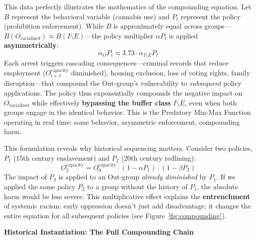 \documentclass[12pt,openany]{book}
\begin{document}
This data perfectly illustrates the mathematics of the compounding equation. Let $B$ represent the behavioral variable (cannabis use) and $P_t$ represent the policy (prohibition enforcement). While $B$ is approximately equal across groups---$B(O_{\text{racialized}}) \approx B(I \setminus E)$---the policy multiplier $\alpha P_t$ is applied \textbf{asymmetrically}:
\[
\alpha_{O} P_t \approx 3.73 \cdot \alpha_{I \setminus E} P_t
\]
Each arrest triggers cascading consequences---criminal records that reduce employment ($O_{t+1}^{\text{capacity}}$ diminished), housing exclusion, loss of voting rights, family disruption---that compound the Out-group's vulnerability to \textit{subsequent} policy applications. The policy thus exponentially compounds the negative impact on $O_{\text{racialized}}$ while effectively \textbf{bypassing the buffer class} $I \setminus E$, even when both groups engage in the identical behavior. This is the Predatory Min-Max Function operating in real time: same behavior, asymmetric enforcement, compounding harm.

This formulation reveals why historical sequencing matters. Consider two policies, $P_1$ (15th century enslavement) and $P_2$ (20th century redlining):
\[
O_2^{\text{capacity}} = O_0^{\text{capacity}} \cdot (1 - \alpha P_1) \cdot (1 - \beta P_2)
\]
The impact of $P_2$ is applied to an Out-group \textit{already diminished} by $P_1$. If we applied the same policy $P_2$ to a group without the history of $P_1$, the absolute harm would be less severe. This multiplicative effect explains the \textbf{entrenchment} of systemic racism: early oppression doesn't just add disadvantage; it changes the entire equation for all subsequent policies (see Figure~\ref{fig:compounding}).

\textbf{Historical Instantiation: The Full Compounding Chain}
\end{document}
